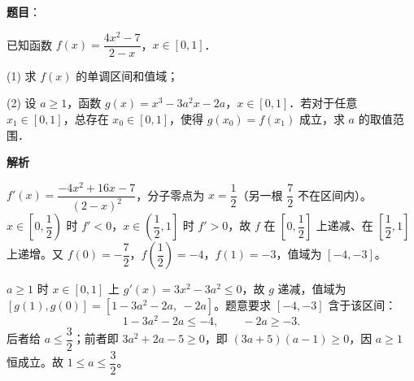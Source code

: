 \begin{answer}

\textbf{题目}：

已知函数 $f(x) = \dfrac{4x^2 - 7}{2 - x}$，$x \in [0, 1]$．

(1) 求 $f(x)$ 的单调区间和值域；

(2) 设 $a \geqslant 1$，函数 $g(x) = x^3 - 3a^2x - 2a$，$x \in [0, 1]$．若对于任意 $x_1 \in [0, 1]$，总存在 $x_0 \in [0, 1]$，使得 $g(x_0) = f(x_1)$ 成立，求 $a$ 的取值范围．

\textbf{解析}


$f'(x) = \dfrac{-4x^2 + 16x - 7}{(2-x)^2}$，分子零点为 $x = \dfrac{1}{2}$（另一根 $\dfrac{7}{2}$ 不在区间内）。$x \in \left[0, \dfrac{1}{2}\right)$ 时 $f' < 0$，$x \in \left(\dfrac{1}{2}, 1\right]$ 时 $f' > 0$，故 $f$ 在 $\left[0, \dfrac{1}{2}\right]$ 上递减、在 $\left[\dfrac{1}{2}, 1\right]$ 上递增。又 $f(0) = -\dfrac{7}{2}$，$f\left(\dfrac{1}{2}\right) = -4$，$f(1) = -3$，值域为 $[-4, -3]$。


$a \geqslant 1$ 时 $x \in [0, 1]$ 上 $g'(x) = 3x^2 - 3a^2 \leqslant 0$，故 $g$ 递减，值域为 $[g(1), g(0)] = \left[1 - 3a^2 - 2a,\ -2a\right]$。题意要求 $[-4, -3]$ 含于该区间：
\nopagebreak[4]
\[
1 - 3a^2 - 2a \leqslant -4,\qquad -2a \geqslant -3.
\]
后者给 $a \leqslant \dfrac{3}{2}$；前者即 $3a^2 + 2a - 5 \geqslant 0$，即 $(3a + 5)(a - 1) \geqslant 0$，因 $a \geqslant 1$ 恒成立。故 $1 \leqslant a \leqslant \dfrac{3}{2}$。



\end{answer}